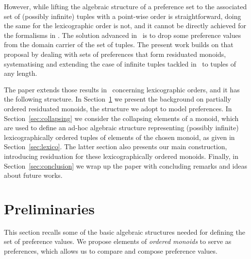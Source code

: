 \documentclass[a4paper]{elsarticle}
\newcommand{\1}{\mathbf{1}}
\begin{document}
%
However, while lifting the algebraic structure of a preference set to the associated set of (possibly infinite) tuples with a point-wise order is straightforward, 
doing the same for the lexicographic order is not, and it cannot be directly achieved for the formalisms in \cite{jacm97,schiex}. 
%
The solution advanced in~\cite{GadducciHMW13,valuation} is to drop some preference values from the domain carrier of the set of tuples. 
%
The present work builds on
that proposal by dealing with sets of preferences that form residuated monoids, systematising and extending the case of infinite tuples tackled in~\cite{sca} 
to tuples of any length.


The paper extends those results in~\cite{jelia2021} concerning lexicographic orders, and it has the following structure. 
In Section~\ref{sec:om} we present  the background on partially ordered residuated monoids, the structure 
we adopt to model preferences. 
%
In Section~\ref{sec:collapsing} we consider the collapsing elements of a monoid, which are used to define an ad-hoc algebraic structure representing 
(possibly infinite) lexicographically ordered tuples of elements of the chosen monoid, as given in Section~\ref{sec:lexico}. 
The latter section also presents our main construction, introducing residuation for these lexicographically ordered monoids.  
Finally, in Section~\ref{sec:conclusion} we wrap up the paper with concluding remarks and ideas about future works.
%

\section{Preliminaries}\label{sec:om}


This section recalls some of the basic algebraic structures needed for defining
the set of preference values. We propose elements of \emph{ordered monoids} 
to serve as preferences, which allows us to compare and compose preference values.
\end{document}
